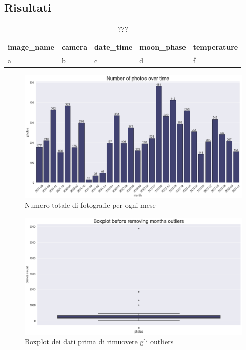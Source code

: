 \documentclass[12pt,a4paper,twoside]{article}
\begin{document}
\subsection{Risultati}

\begin{table}[h!]
    \centering
    \begin{tabular}{|l|l|l|l|l|}
        \hline
        \textbf{image\_name} & \textbf{camera} & \textbf{date\_time} & \textbf{moon\_phase} & \textbf{temperature} \\ 
        \hline
        a & b & c & d & f\\
        \hline
    \end{tabular}
    \caption{???}
\end{table}

\begin{figure}[h!]
    \centering
    \includegraphics[width=\textwidth ,height=\textheight, keepaspectratio]{assets/photos-ot.png}
    \caption{Numero totale di fotografie per ogni mese}
    \label{fig:photos-ot}
\end{figure}

\begin{figure}[h!]
    \centering
    \includegraphics[width=\textwidth ,height=\textheight, keepaspectratio]{assets/boxplot-outliers.png}
    \caption{Boxplot dei dati prima di rimuovere gli outliers}
    \label{fig:boxplot-outliers}
\end{figure}
\end{document}

